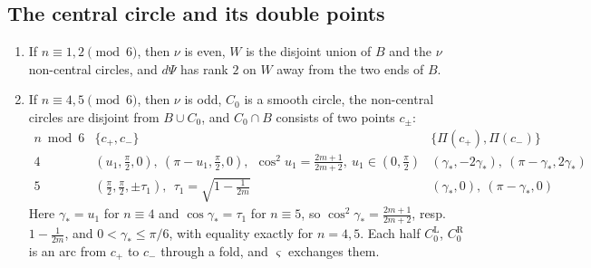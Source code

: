 \subsection{The central circle and its double points}\label{sec:crossings}

\begin{proposition}\label{prop:central}
\begin{enumerate}
\item If $n\equiv1,2\pmod6$, then $\nu$ is even, $W$ is the disjoint union of $B$ and the $\nu$ non-central circles,
and $d\Psi$ has rank $2$ on $W$ away from the two ends of $B$.
\item If $n\equiv4,5\pmod6$, then $\nu$ is odd, $C_0$ is a smooth circle, the non-central circles are disjoint from
$B\cup C_0$, and $C_0\cap B$ consists of two points $c_\pm$:
\[
\begin{array}{c|c|c}
n\bmod6 & \{c_+,c_-\} & \{\Pi(c_+),\Pi(c_-)\}\\ \hline
4 & (u_1,\tfrac\pi2,0),\ (\pi-u_1,\tfrac\pi2,0),\ \ \cos^2u_1=\tfrac{2m+1}{2m+2},\ u_1\in(0,\tfrac\pi2) & (\gamma_*,-2\gamma_*),\ (\pi-\gamma_*,2\gamma_*)\\
5 & (\tfrac\pi2,\tfrac\pi2,\pm\tau_1),\ \ \tau_1=\sqrt{1-\tfrac1{2m}} & (\gamma_*,0),\ (\pi-\gamma_*,0)
\end{array}
\]
Here $\gamma_*=u_1$ for $n\equiv4$ and $\cos\gamma_*=\tau_1$ for $n\equiv5$, so $\cos^2\gamma_*=\frac{2m+1}{2m+2}$, resp.\
$1-\frac1{2m}$, and $0<\gamma_*\le\pi/6$, with equality exactly for $n=4,5$. Each half $C_0^{\mathrm L}$,
$C_0^{\mathrm R}$ is an arc from $c_+$ to $c_-$ through a fold, and $\varsigma$ exchanges them.
\end{enumerate}
\end{proposition}

